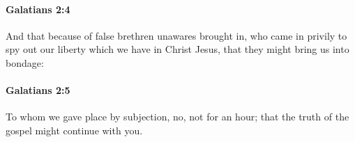 		\paragraph{Galatians 2:4} %
			\label{GALATIANS-2-4}

			And that because of false brethren unawares brought in, who came in privily to spy out our liberty which we have in Christ Jesus, that they might bring us into bondage:

			\begin{framed}
			\scriptsize
				\begin{compactdesc}
					\item[SBLG] 
				\end{compactdesc}
			\end{framed}

		\paragraph{Galatians 2:5} %
			\label{GALATIANS-2-5}

			To whom we gave place by subjection, no, not for an hour; that the truth of the gospel might continue with you.

